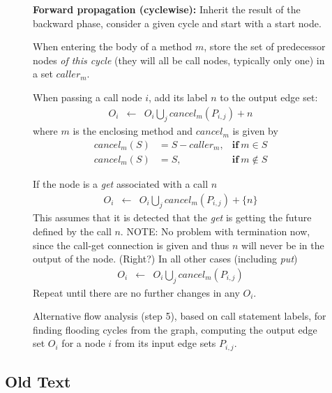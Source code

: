 \documentclass[12pt]{article}%
\begin{document}
{\begin{figure}
\begin{shaded}
\textbf{Forward propagation (cyclewise):}
Inherit the result of the backward phase, consider a given cycle 
and 
start with a start node. 

When entering the body of a method  $m$, store the set of 
predecessor nodes \emph{of this cycle} (they will all be call nodes,
typically only one)
in a  set $caller_m$.

When passing a call node $i$, %
add its label $n$ to the output edge set:
$$\begin{array}{lll}
O_i&\leftarrow& O_i \bigcup_j cancel_m(P_{i,j}) + n%
\end{array}$$
where $m$ is the enclosing method and $cancel_m$ is given by
$$\begin{array}{lll}
cancel_m(S)&= S - caller_m,& \textbf{if}\ m\in S\\
cancel_m(S)&= S , &\textbf{if}\ m\not\in S%
\end{array}$$
% 
%
If the node is a \emph{get} associated with a call $n$
$$\begin{array}{lll}
O_i&\leftarrow& O_i \bigcup_j  cancel_m(P_{i,j}) + \{{n}\}%
\end{array}$$
This assumes that it is detected that the \emph{get} is getting the future
defined by the call $n$.
{NOTE: No problem with termination  now,
since the call-get  connection is given and thus $n$ will never be 
in the output  of the node. (Right?)}
In all other cases (including \emph{put})
$$\begin{array}{lll}
O_i&\leftarrow& O_i \bigcup_j cancel_m(P_{i,j}) %
\end{array}$$
Repeat until there are no further changes in any $O_i$.%
\end{shaded}%
\caption{\label{step5a}%
Alternative flow analysis (step 5), based on call statement labels, for finding flooding cycles from the graph,
computing the output edge set $O_i$ for a node $i$ from its input edge sets 
$P_{i,j}$.
}
\end{figure}

}
\subsection{Old Text}
\end{document}
